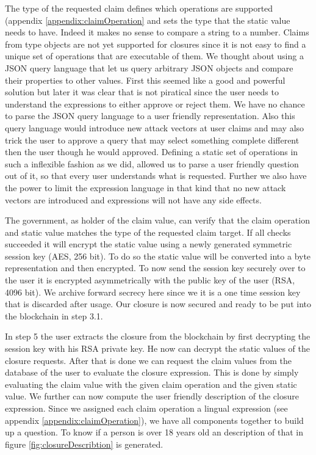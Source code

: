 The type of the requested claim defines which operations are supported (appendix \ref{appendix:claimOperation} and sets the type that the static value needs to have. Indeed it makes no sense to compare a string to a number. Claims from type objects are not yet supported for closures since it is not easy to find a unique set of operations that are executable of them. We thought about using a JSON query language that let us query arbitrary JSON objects and compare their properties to other values. First this seemed like a good and powerful solution but later it was clear that is not piratical since the user needs to understand the expressions to either approve or reject them. We have no chance to parse the JSON query language to a user friendly representation. Also this query language would introduce new attack vectors at user claims and may also trick the user to approve a query that may select something complete different then the user though he would approved. Defining a static set of operations in such a inflexible fashion as we did, allowed us to parse a user friendly question out of it, so that every user understands what is requested. Further we also have the power to limit the expression language in that kind that no new attack vectors are introduced and expressions will not have any side effects. 

The government, as holder of the claim value, can verify that the claim operation and static value matches the type of the requested claim target. If all checks succeeded it will encrypt the static value using a newly generated symmetric session key (AES, 256 bit). To do so the static value will be converted into a byte representation and then encrypted. To now send the session key securely over to the user it is encrypted asymmetrically with the public key of the user (RSA, 4096 bit). We archive forward secrecy here since we it is a one time session key that is discarded after usage. Our closure is now secured and ready to be put into the blockchain in step 3.1. 

In step 5 the user extracts the closure from the blockchain by first decrypting the session key with his RSA private key. He now can decrypt the static values of the closure requests. After that is done we can request the claim values from the database of the user to evaluate the closure expression. This is done by simply evaluating the claim value with the given claim operation and the given static value. We further can now compute the user friendly description of the closure expression. Since we assigned each claim operation a lingual expression (see appendix \ref{appendix:claimOperation}), we have all components together to build up a question. To know if a person is over 18 years old an description of that in figure \ref{fig:closureDescribtion} is generated.

